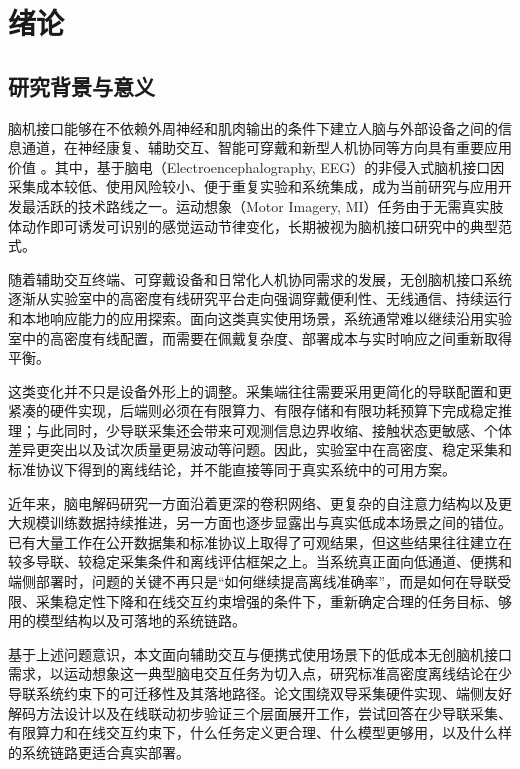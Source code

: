 \chapter{绪论}
\label{cha:intro}

\section{研究背景与意义}

脑机接口能够在不依赖外周神经和肌肉输出的条件下建立人脑与外部设备之间的信息通道，在神经康复、辅助交互、智能可穿戴和新型人机协同等方向具有重要应用价值 \cite{lotte2018review}。其中，基于脑电（Electroencephalography, EEG）的非侵入式脑机接口因采集成本较低、使用风险较小、便于重复实验和系统集成，成为当前研究与应用开发最活跃的技术路线之一。运动想象（Motor Imagery, MI）任务由于无需真实肢体动作即可诱发可识别的感觉运动节律变化，长期被视为脑机接口研究中的典型范式。

随着辅助交互终端、可穿戴设备和日常化人机协同需求的发展，无创脑机接口系统逐渐从实验室中的高密度有线研究平台走向强调穿戴便利性、无线通信、持续运行和本地响应能力的应用探索。面向这类真实使用场景，系统通常难以继续沿用实验室中的高密度有线配置，而需要在佩戴复杂度、部署成本与实时响应之间重新取得平衡。

这类变化并不只是设备外形上的调整。采集端往往需要采用更简化的导联配置和更紧凑的硬件实现，后端则必须在有限算力、有限存储和有限功耗预算下完成稳定推理；与此同时，少导联采集还会带来可观测信息边界收缩、接触状态更敏感、个体差异更突出以及试次质量更易波动等问题。因此，实验室中在高密度、稳定采集和标准协议下得到的离线结论，并不能直接等同于真实系统中的可用方案。

近年来，脑电解码研究一方面沿着更深的卷积网络、更复杂的自注意力结构以及更大规模训练数据持续推进，另一方面也逐步显露出与真实低成本场景之间的错位。已有大量工作在公开数据集和标准协议上取得了可观结果，但这些结果往往建立在较多导联、较稳定采集条件和离线评估框架之上。当系统真正面向低通道、便携和端侧部署时，问题的关键不再只是“如何继续提高离线准确率”，而是如何在导联受限、采集稳定性下降和在线交互约束增强的条件下，重新确定合理的任务目标、够用的模型结构以及可落地的系统链路。

基于上述问题意识，本文面向辅助交互与便携式使用场景下的低成本无创脑机接口需求，以运动想象这一典型脑电交互任务为切入点，研究标准高密度离线结论在少导联系统约束下的可迁移性及其落地路径。论文围绕双导采集硬件实现、端侧友好解码方法设计以及在线联动初步验证三个层面展开工作，尝试回答在少导联采集、有限算力和在线交互约束下，什么任务定义更合理、什么模型更够用，以及什么样的系统链路更适合真实部署。

